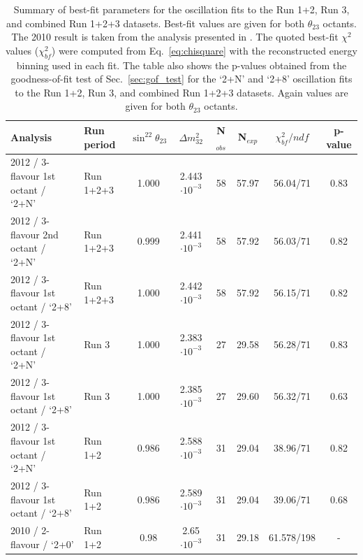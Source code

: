 %
%
\begin{table}
\centering
\begin{tabular}{| l | l | c | c | c  c | c | c |}
\hline
Analysis & Run period & $\sin^22\theta_{23}$ & $\Delta m_{32}^2$ & N$_{obs}$ & N$_{exp}$ & $\chi^2_{bf} / ndf$ & p-value \\
\hline
2012 / 3-flavour 1st octant / `2+N' & Run 1+2+3 & 1.000 &  2.443 $\cdot 10^{-3}$ & 58 & 57.97 & 56.04/71 & 0.83 \\
2012 / 3-flavour 2nd octant / `2+N' & Run 1+2+3 & 0.999 &  2.441 $\cdot 10^{-3}$ & 58 & 57.92 & 56.03/71 & 0.82 \\
2012 / 3-flavour 1st octant / `2+8' & Run 1+2+3 & 1.000 &  2.442 $\cdot 10^{-3}$ & 58 & 57.92 & 56.15/71 & 0.82 \\
\hline
2012 / 3-flavour 1st octant / `2+N' & Run 3     & 1.000 &  2.383 $\cdot 10^{-3}$ & 27 & 29.58 & 56.28/71 & 0.83 \\
2012 / 3-flavour 1st octant / `2+8' & Run 3     & 1.000 &  2.385 $\cdot 10^{-3}$ & 27 & 29.60 & 56.32/71 & 0.63 \\
\hline
2012 / 3-flavour 1st octant / `2+N' & Run 1+2   & 0.986 &  2.588 $\cdot 10^{-3}$ & 31 & 29.04 & 38.96/71 & 0.82 \\
2012 / 3-flavour 1st octant / `2+8' & Run 1+2   & 0.986 &  2.589 $\cdot 10^{-3}$ & 31 & 29.04 & 39.06/71 & 0.68 \\
2010 / 2-flavour  / `2+0'           & Run 1+2   & 0.98  &  2.65  $\cdot 10^{-3}$ & 31 & 29.18 & 61.578/198  & - \\
\hline
\end{tabular}
\caption{
  Summary of best-fit parameters for the oscillation fits to the Run 1+2, Run 3, and combined Run 1+2+3 datasets. 
  Best-fit values are given for both $\theta_{23}$ octants.
  The 2010 result is taken from the analysis presented in \cite{OurRun12DisappAnalysis}.
  The quoted best-fit $\chi^2$ values ($\chi^2_{bf}$) were computed from Eq.\ \ref{eq:chisquare} 
  with the reconstructed energy binning used in each fit.
  The table also shows the p-values obtained from the goodness-of-fit test of Sec.\ \ref{sec:gof_test}
  for the `2+N' and `2+8' oscillation fits to the Run 1+2, Run 3, and combined Run 1+2+3 datasets. Again values are 
  given for both $\theta_{23}$ octants.
}
\label{tab:data_fits:best_fit_values}
\end{table}

%
%

